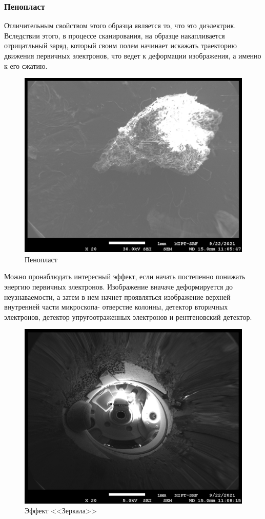 \documentclass[a4paper,12pt]{article}
\theoremstyle{plain} %
\theoremstyle{definition} %
\theoremstyle{remark} %
\newcommand{\picref}[1]{
	\text{рис(\ref{#1})}
}
\begin{document}
\subsubsection{Пенопласт}
Отличительным свойством этого образца \picref{pic14} является то, что это диэлектрик. Вследствии этого, в процессе сканирования, на образце накапливается отрицатльный заряд, который своим полем начинает искажать траекторию движения первичных электронов, что ведет к деформации изображения, а именно к его сжатию.


\begin{figure}[h!]
	\centering
	\includegraphics[scale=1]{pic14.jpg}
	\caption{Пенопласт}
	\label{pic14}
\end{figure}

Можно пронаблюдать интересный эффект, если начать постепенно понижать энергию первичных электронов. Изображение вначаче деформируется до неузнаваемости, а затем в нем начнет проявляться изображение верхней внутренней части микроскопа- отверстие колонны, детектор вторичных электронов, детектор упругоотраженных электронов и рентгеновский детектор.
\begin{figure}[h!]
	\centering
	\includegraphics[scale=1]{pic15.jpg}
	\caption{Эффект <<Зеркала>>}
	\label{pic15}
\end{figure}
\end{document}
